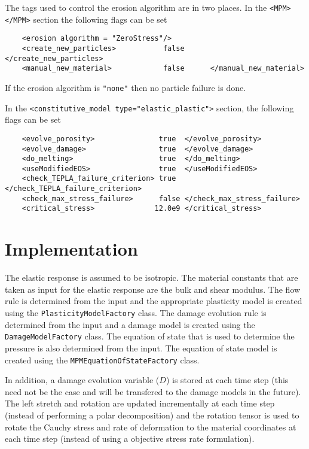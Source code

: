   The tags used to control the erosion algorithm are in two places.  
  In the \verb|<MPM> </MPM>| section the following flags can be set
  \lstset{language=XML}
  \begin{lstlisting}
    <erosion algorithm = "ZeroStress"/>
    <create_new_particles>           false      </create_new_particles>
    <manual_new_material>            false      </manual_new_material>
  \end{lstlisting}
  If the erosion algorithm is \verb|"none"| then no particle failure is done.

  In the \verb|<constitutive_model type="elastic_plastic">| section, the 
  following flags can be set
  \lstset{language=XML}
  \begin{lstlisting}
    <evolve_porosity>               true  </evolve_porosity>
    <evolve_damage>                 true  </evolve_damage>
    <do_melting>                    true  </do_melting>
    <useModifiedEOS>                true  </useModifiedEOS>
    <check_TEPLA_failure_criterion> true  </check_TEPLA_failure_criterion>
    <check_max_stress_failure>      false </check_max_stress_failure>
    <critical_stress>              12.0e9 </critical_stress>
  \end{lstlisting}

\section{Implementation}
The elastic response is assumed to be isotropic.  The material
constants that are taken as input for the elastic response are the
bulk and shear modulus.  The flow rule is determined from the input
and the appropriate plasticity model is created using the 
\verb+PlasticityModelFactory+ class.  The damage evolution rule
is determined from the input and a damage model is created using
the \verb+DamageModelFactory+ class.  The equation of state 
that is used to determine the pressure is also determined from the
input.  The equation of state model is created using the 
\verb+MPMEquationOfStateFactory+ class.

In addition, a damage evolution variable ($D$) is stored at each time 
step (this need not be the case and will be transfered to the 
damage models in the future).  The left stretch and rotation are 
updated incrementally at each
time step (instead of performing a polar decomposition) and the 
rotation tensor is used to rotate the Cauchy stress and rate of deformation
to the material coordinates at each time step (instead of using a 
objective stress rate formulation).  

